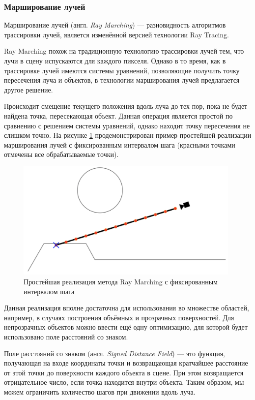 \subsubsection{Марширование лучей}
Марширование лучей (англ. \textit{Ray Marching}) \cite{raymarching} --- разновидность алгоритмов 
трассировки лучей, является изменённой версией технологии Ray Tracing.

Ray Marching похож на традиционную технологию трассировки лучей 
тем, что лучи в сцену испускаются для каждого пикселя.
Однако в то время, как 
в трассировке лучей имеются системы уравнений, позволяющие получить 
точку пересечения луча и объектов, в технологии марширования лучей 
предлагается другое решение.

Происходит смещение текущего положения вдоль луча до тех пор, пока не будет найдена точка, пересекающая 
объект.
Данная операция является простой по сравнению с решением системы 
уравнений, однако находит точку пересечения не слишком точно. 
На рисунке \ref{fig:raymarchingfixed} продемонстрирован пример простейшей реализации марширования лучей с фиксированным интервалом шага (красными точками отмечены все обрабатываемые точки).

\clearpage

\begin{figure}[h]
	\centering
	\captionsetup{justification=centering}
	\includegraphics[width=110mm]{img/raymarchingfixed.png}
	\caption{Простейшая реализация метода Ray Marching с фиксированным интервалом шага}
	\label{fig:raymarchingfixed}
\end{figure}

Данная реализация вполне достаточна для использования во множестве 
областей, например, в случаях построения объёмных и прозрачных 
поверхностей.
Для непрозрачных объектов можно ввести ещё одну 
оптимизацию, для которой будет использовано поле расстояний со знаком.

Поле расстояний со знаком (англ. \textit{Signed Distance Field}) — это функция, 
получающая на входе координаты точки и возвращающая кратчайшее 
расстояние от этой точки до поверхности каждого объекта в сцене.
При этом возвращается отрицательное число, если точка находится внутри объекта.
Таким образом, мы можем ограничить количество шагов при движении вдоль 
луча.

